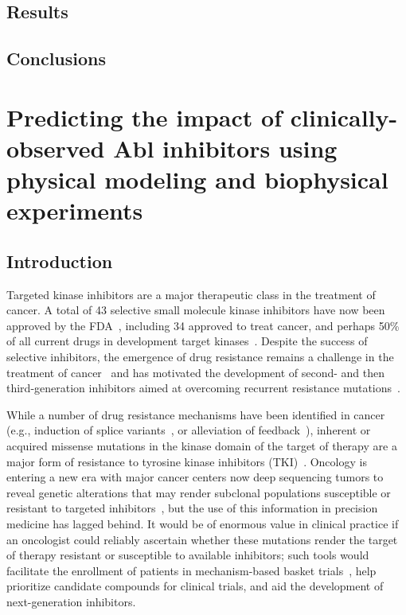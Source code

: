 \documentclass[phd,tocprelim]{cornell}
\begin{document}
\section{Results}
\section{Conclusions}

\chapter{Predicting the impact of clinically-observed Abl inhibitors using physical modeling and biophysical experiments}
\section{Introduction}
Targeted kinase inhibitors are a major therapeutic class in the treatment of cancer.
A total of 43 selective small molecule kinase inhibitors have now been approved by the FDA~\citep{fda-approved-kinase-inhibitors}, including 34 approved to treat cancer, and perhaps 50\% of all current drugs in development target kinases~\citep{Santos:Nat.Rev.DrugDiscov.:2016}.
  Despite the success of selective inhibitors, the emergence of drug resistance remains a challenge in the treatment of cancer~\citep{Shah:CancerCell:2002,BUCZEK201431,huang2015mechanisms,Meyer2051,Davare29092015,VanAllen94,Rani3821,Holohan:Nat.Rev.Cancer:2013} and has motivated the development of second- and then third-generation inhibitors aimed at overcoming recurrent resistance mutations~\citep{Weisberg:Nat.Rev.Cancer:2007,Y.Lu:Curr.Med.Chem.:2011,Juchum:DrugResist.Updat.:2015,Song:ActaPharm.Sin.B:2015,Neel:NpjPrecis.Oncol.:2017}.   

  While a number of drug resistance mechanisms have been identified in cancer (e.g., induction of splice variants~\citep{Gruber2006}, or alleviation of feedback~\citep{Chandarlapaty:CancerCell:2011}), inherent or acquired missense mutations in the kinase domain of the target of therapy are a major form of resistance to tyrosine kinase inhibitors (TKI)~\citep{Knight:Nat.Rev.Cancer:2010,Holohan:Nat.Rev.Cancer:2013,Housman:Cancers:2014}.
  Oncology is entering a new era with major cancer centers now deep sequencing tumors to reveal genetic alterations that may render subclonal populations susceptible or resistant to targeted inhibitors~\citep{Zehir:Nat.Med.:2017}, but the use of this information in precision medicine has lagged behind. 
  It would be of enormous value in clinical practice if an oncologist could reliably ascertain whether these mutations render the target of therapy resistant or susceptible to available inhibitors; such tools would facilitate the enrollment of patients in mechanism-based basket trials~\citep{Redig::2015,Hyman:Cell:2017}, help prioritize candidate compounds for clinical trials, and aid the development of next-generation inhibitors. 
\end{document}
